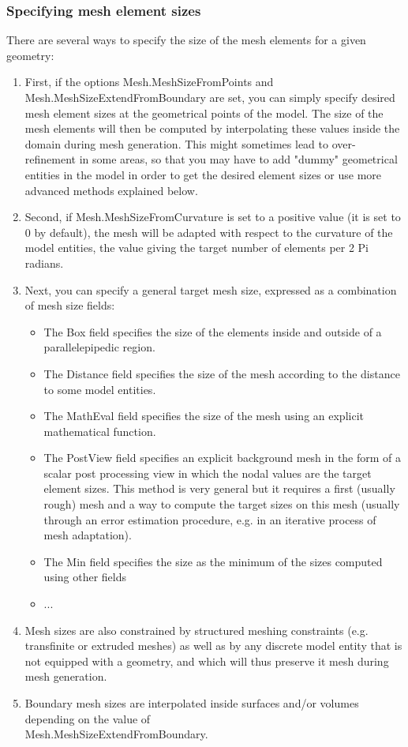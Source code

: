 \documentclass[dvipdfmx, 9pt, a4paper]{article}
\numberwithin{equation}{section}
\begin{document}
\subsubsection{Specifying mesh element sizes}
There are several ways to specify the size of the mesh elements for a given geometry:
\begin{enumerate}
\item First, if the options Mesh.MeshSizeFromPoints and Mesh.MeshSizeExtendFromBoundary are set, you can simply specify desired mesh element sizes at the geometrical points of the model. The size of the mesh elements will then be computed by interpolating these values inside the domain during mesh generation. This might sometimes lead to over-refinement in some areas, so that you may have to add "dummy" geometrical entities in the model in order to get the desired element sizes or use more advanced methods explained below.
\item  Second, if Mesh.MeshSizeFromCurvature is set to a positive value (it is set to 0 by default), the mesh will be adapted with respect to the curvature of the model entities, the value giving the target number of elements per 2 Pi radians.
\item Next, you can specify a general target mesh size, expressed as a combination of mesh size fields:
\begin{itemize}
\item The Box field specifies the size of the elements inside and outside of a parallelepipedic region.
\item The Distance field specifies the size of the mesh according to the distance to some model entities.
\item The MathEval field specifies the size of the mesh using an explicit mathematical function.
\item The PostView field specifies an explicit background mesh in the form of a scalar post processing view in which the nodal values are the target element sizes. This method is very general but it requires a first (usually rough) mesh and a way to compute the target sizes on this mesh (usually through an error estimation procedure, e.g. in an iterative process of mesh adaptation).
\item The Min field specifies the size as the minimum of the sizes computed using other fields
\item ...
\end{itemize}
\item Mesh sizes are also constrained by structured meshing constraints (e.g. transfinite or extruded meshes) as well as by any discrete model entity that is not equipped with a geometry, and which will thus preserve it mesh during mesh generation.
\item Boundary mesh sizes are interpolated inside surfaces and/or volumes depending on the value of\\ Mesh.MeshSizeExtendFromBoundary.
\end{enumerate}
\end{document}
